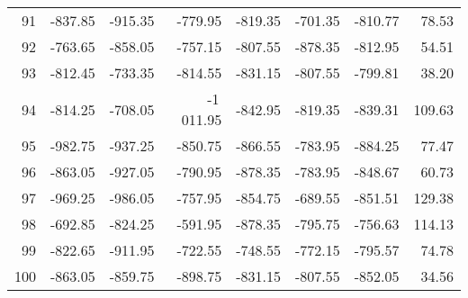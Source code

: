 \begin{longtable}{rrrrrrrr}
91 & -837.85 & -915.35 & -779.95 & -819.35 & -701.35 & -810.77 & 78.53  \\
92 & -763.65 & -858.05 & -757.15 & -807.55 & -878.35 & -812.95 & 54.51  \\
93 & -812.45 & -733.35 & -814.55 & -831.15 & -807.55 & -799.81 & 38.20  \\
94 & -814.25 & -708.05 & -1\,011.95 & -842.95 & -819.35 & -839.31 & 109.63  \\
95 & -982.75 & -937.25 & -850.75 & -866.55 & -783.95 & -884.25 & 77.47  \\
96 & -863.05 & -927.05 & -790.95 & -878.35 & -783.95 & -848.67 & 60.73  \\
97 & -969.25 & -986.05 & -757.95 & -854.75 & -689.55 & -851.51 & 129.38  \\
98 & -692.85 & -824.25 & -591.95 & -878.35 & -795.75 & -756.63 & 114.13  \\
99 & -822.65 & -911.95 & -722.55 & -748.55 & -772.15 & -795.57 & 74.78  \\
100 & -863.05 & -859.75 & -898.75 & -831.15 & -807.55 & -852.05 & 34.56  \\

\end{longtable}


